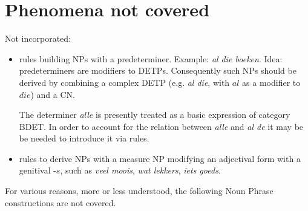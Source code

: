 \section{Phenomena not covered}
Not incorporated: \\
\begin{itemize}
  \item 
rules building NPs with a predeterminer. Example:
{\em al die boeken}.
Idea: predeterminers are modifiers to DETPs. Consequently such NPs should be 
derived by combining a complex DETP (e.g. {\em al die}, with $al$ as a modifier
to $die$) and a CN. 

The determiner {\em alle} is presently treated as a basic expression of 
category BDET. In
order to account for the relation between {\em alle} and {\em al de } it may be 
be needed to introduce it via rules.\\


  \item 
rules to derive NPs with a  measure NP 
modifying an adjectival form with a genitival -$s$,
such as {\em veel moois}, {\em wat lekkers}, {\em iets goeds}.
\end{itemize}





For various reasons, 
more or less understood,
the following Noun Phrase constructions are not covered.

